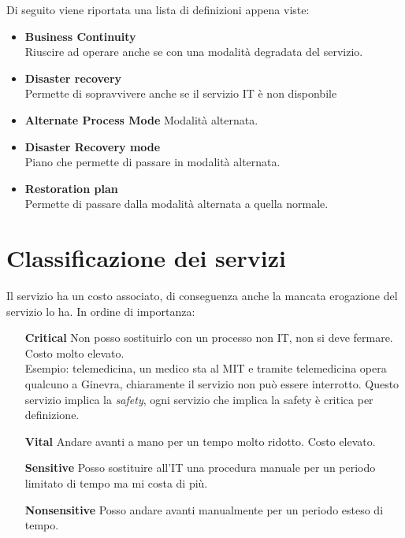 Di seguito viene riportata una lista di definizioni appena viste:

\begin{itemize}
 \item \textbf{Business Continuity} \\
 Riuscire ad operare anche se con una modalità degradata del servizio.
 \item \textbf{Disaster recovery} \\
 Permette di sopravvivere anche se il servizio IT è non disponbile
 \item \textbf{Alternate Process Mode} 
 Modalità alternata.
 \item \textbf{Disaster Recovery mode} \\
 Piano che permette di passare in modalità alternata.
 \item \textbf{Restoration plan} \\
 Permette di passare dalla modalità alternata a quella normale.
\end{itemize}

\section{Classificazione dei servizi}

Il servizio ha un costo associato, di conseguenza anche la mancata erogazione 
del servizio lo ha. In ordine di importanza:
\begin{enumerate}
 \item[\textbf{Critical}] Non posso sostituirlo con un processo non IT, non si 
deve fermare. Costo molto elevato. \\
Esempio: telemedicina, un medico sta al MIT 
e tramite telemedicina opera qualcuno a Ginevra, chiaramente il servizio non 
può essere interrotto. Questo servizio implica la \textit{safety}, ogni 
servizio che implica la safety è critica per definizione.

 \item[\textbf{Vital}] Andare avanti a mano per un tempo molto ridotto. Costo 
elevato.

 \item[\textbf{Sensitive}] Posso sostituire all'IT una procedura manuale per un 
periodo limitato di tempo ma mi costa di più. 

 \item[\textbf{Nonsensitive}] Posso andare avanti manualmente per un periodo 
esteso di tempo. 

\end{enumerate}

